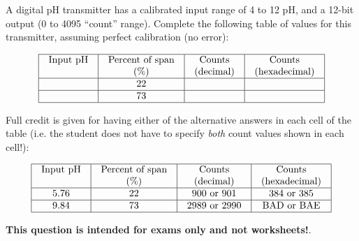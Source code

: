 

A digital pH transmitter has a calibrated input range of 4 to 12 pH, and a 12-bit output (0 to 4095 ``count'' range).  Complete the following table of values for this transmitter, assuming perfect calibration (no error):


$$\vbox{\offinterlineskip
\halign{\strut
\vrule \quad\hfil # \ \hfil & 
\vrule \quad\hfil # \ \hfil & 
\vrule \quad\hfil # \ \hfil & 
\vrule \quad\hfil # \ \hfil \vrule \cr
\noalign{\hrule}
%
Input pH & Percent of span & Counts & Counts \cr
%
 & (\%) & (decimal) & (hexadecimal) \cr
%
\noalign{\hrule}
%
 & 22 &  &  \cr
%
\noalign{\hrule}
%
 & 73 &  &  \cr
%
\noalign{\hrule}
} %
}$$ %







Full credit is given for having either of the alternative answers in each cell of the table (i.e. the student does not have to specify {\it both} count values shown in each cell!):


$$\vbox{\offinterlineskip
\halign{\strut
\vrule \quad\hfil # \ \hfil & 
\vrule \quad\hfil # \ \hfil & 
\vrule \quad\hfil # \ \hfil & 
\vrule \quad\hfil # \ \hfil \vrule \cr
\noalign{\hrule}
%
Input pH & Percent of span & Counts & Counts \cr
%
 & (\%) & (decimal) & (hexadecimal) \cr
%
\noalign{\hrule}
%
5.76 & 22 & 900 or 901 & 384 or 385 \cr
%
\noalign{\hrule}
%
9.84 & 73 & 2989 or 2990 & BAD or BAE \cr
%
\noalign{\hrule}
} %
}$$ %







{\bf This question is intended for exams only and not worksheets!}.



